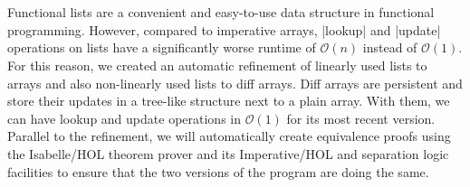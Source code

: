 \chapter{\abstractname}

Functional lists are a convenient and easy-to-use data structure in functional programming. However, compared to imperative arrays, |lookup| and |update| operations on lists have a significantly worse runtime of $\mathcal{O}(n)$ instead of $\mathcal{O}(1)$. For this reason, we created an automatic refinement of linearly used lists to arrays and also non-linearly used lists to diff arrays. Diff arrays are persistent and store their updates in a tree-like structure next to a plain array. With them, we can have lookup and update operations in $\mathcal{O}(1)$ for its most recent version.\\
Parallel to the refinement, we will automatically create equivalence proofs using the Isabelle/HOL theorem prover and its Imperative/HOL and separation logic facilities to ensure that the two versions of the program are doing the same. 
